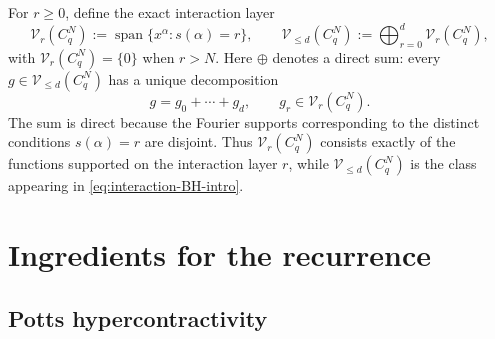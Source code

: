 \documentclass[11pt,a4paper]{article}
\numberwithin{equation}{section}
\theoremstyle{cleanplain}
\theoremstyle{cleandefinition}
\theoremstyle{cleanremark}
\begin{document}
For $r\geq0$, define the exact interaction layer
\begin{equation}\label{eq:Vr-cyclic}
 \mathcal V_r(C_q^N)
 :=\operatorname{span}\{x^\alpha:s(\alpha)=r\},
 \qquad
 \mathcal V_{\leq d}(C_q^N)
 :=\bigoplus_{r=0}^d\mathcal V_r(C_q^N),
\end{equation}
with $\mathcal V_r(C_q^N)=\{0\}$ when $r>N$.  Here $\oplus$ denotes a
direct sum: every $g\in\mathcal V_{\leq d}(C_q^N)$ has a unique
decomposition
\[
 g=g_0+\cdots+g_d,
 \qquad g_r\in\mathcal V_r(C_q^N).
\]
The sum is direct because the Fourier supports corresponding to the distinct
conditions $s(\alpha)=r$ are disjoint.  Thus $\mathcal V_r(C_q^N)$ consists
exactly of the functions supported on the interaction layer $r$, while
$\mathcal V_{\leq d}(C_q^N)$ is the class appearing in
\eqref{eq:interaction-BH-intro}.


\section{Ingredients for the recurrence}\label{sec:ingredients}

\subsection{Potts hypercontractivity}\label{sec:potts}
\end{document}
